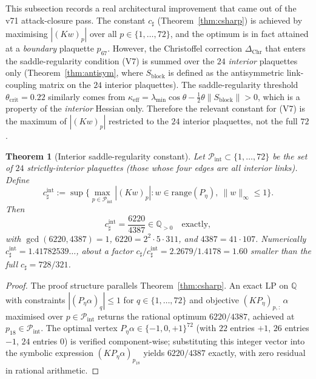 \documentclass[11pt]{article}
\newtheorem{theorem}{Theorem}[section]
\theoremstyle{definition}
\newcommand{\Q}{\mathbb{Q}}
\begin{document}
This subsection records a real architectural improvement that came out
of the v71 attack-closure pass.  The constant $c_\sharp$
(Theorem~\ref{thm:csharp}) is achieved by maximising
$|(Kw)_p|$ over all $p\in\{1,\ldots,72\}$, and the optimum is in fact
attained at a \emph{boundary} plaquette $p_{67}$.  However, the
Christoffel correction $\Delta_{\mathrm{Chr}}$ that enters the
saddle-regularity condition (V7) is summed over the $24$
\emph{interior} plaquettes only \textup{(}Theorem~\ref{thm:antisym},
where $S_{\mathrm{block}}$ is defined as the antisymmetric
link-coupling matrix on the $24$ interior plaquettes\textup{)}.  The
saddle-regularity threshold $\theta_{\mathrm{crit}}=0.22$ similarly
comes from $\kappa_{\mathrm{eff}}=\lambda_{\min}\cos\theta-
\tfrac{1}{2}\theta\|S_{\mathrm{block}}\|>0$, which is a property of
the \emph{interior} Hessian only.  Therefore the relevant constant for
(V7) is the maximum of $|(Kw)_p|$ restricted to the $24$ interior
plaquettes, not the full $72$.

\begin{theorem}[Interior saddle-regularity constant]\label{thm:csharp-int}
Let $\mathcal P_{\mathrm{int}}\subset\{1,\ldots,72\}$ be the set of
$24$ strictly-interior plaquettes \textup{(}those whose four edges are
all interior links\textup{)}.  Define
\begin{equation}\label{eq:csharp-int-def}
c_\sharp^{\mathrm{int}}:=\sup\bigl\{\max_{p\in\mathcal P_{\mathrm{int}}}|(Kw)_p|
:w\in\mathrm{range}(P_\eta),\ \|w\|_\infty\le 1\bigr\}.
\end{equation}
Then
\[
c_\sharp^{\mathrm{int}}=\frac{6220}{4387}\in\Q_{>0}\quad\text{exactly},
\]
with $\gcd(6220,4387)=1$, $6220=2^2\cdot 5\cdot 311$, and
$4387=41\cdot 107$.  Numerically $c_\sharp^{\mathrm{int}}=1.41782539\ldots$,
about a factor $c_\sharp/c_\sharp^{\mathrm{int}}=2.2679/1.4178=1.60$
smaller than the full $c_\sharp=728/321$.
\end{theorem}

\begin{proof}
The proof structure parallels Theorem~\ref{thm:csharp}.  An exact LP
on $\Q$ with constraints
$|(P_\eta\alpha)_q|\le 1$ for $q\in\{1,\ldots,72\}$ and objective
$(KP_\eta)_{p,:}\,\alpha$ maximised over $p\in\mathcal P_{\mathrm{int}}$
returns the rational optimum $6220/4387$, achieved at $p_{18}\in
\mathcal P_{\mathrm{int}}$.  The optimal vertex
$P_\eta\alpha\in\{-1,0,+1\}^{72}$ \textup{(}with $22$ entries $+1$,
$26$ entries $-1$, $24$ entries $0$\textup{)} is verified
component-wise; substituting this integer vector into the symbolic
expression $(K P_\eta\alpha)_{p_{18}}$ yields $6220/4387$ exactly,
with zero residual in rational arithmetic.
\end{proof}
\end{document}
